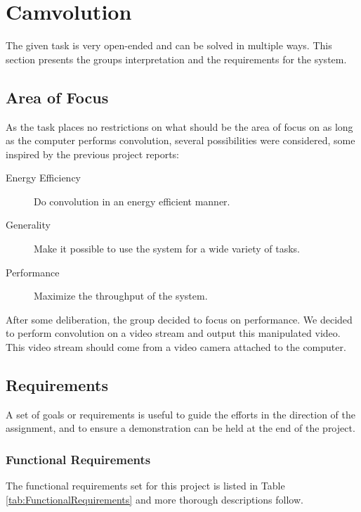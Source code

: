 \section{Camvolution}
The given task is very open-ended and can be solved in multiple ways.
This section presents the groups interpretation and the requirements for the system.

\subsection{Area of Focus}
As the task places no restrictions on what should be the area of focus on as long as the computer performs convolution, several possibilities were considered, some inspired by the previous project reports:

\begin{description}
    \item[Energy Efficiency] Do convolution in an energy efficient manner.
    \item[Generality] Make it possible to use the system for a wide variety of tasks.
    \item[Performance] Maximize the throughput of the system.
\end{description}

After some deliberation,
the group decided to focus on performance.
We decided to perform convolution on a video stream and output this manipulated video.
This video stream should come from a video camera attached to the computer.

\subsection{Requirements}
A set of goals or requirements is useful to guide the efforts in the direction of the assignment, and to ensure a demonstration can be held at the end of the project.

\subsubsection{Functional Requirements}
The functional requirements set for this project is listed in Table \ref{tab:FunctionalRequirements} and more thorough descriptions follow.

